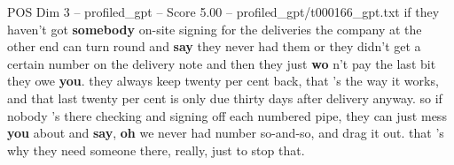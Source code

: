 \begin{textsample}{POS Dim 3 – profiled\_gpt – Score 5.00 – profiled\_gpt/t000166\_gpt.txt}  \label{ex:f3_pos_025}
if they haven't got \textbf{somebody} on-site signing for the deliveries the company at the other end can turn round and \textbf{say} they never had them or they didn't get a certain number on the delivery note and then they just \textbf{wo} n't pay the last bit they owe \textbf{you}. they always keep twenty per cent back, that 's the way it works, and that last twenty per cent is only due thirty days after delivery anyway. so if nobody 's there checking and signing off each numbered pipe, they can just mess \textbf{you} about and \textbf{say}, \textbf{oh} we never had number so-and-so, and drag it out. that 's why they need someone there, really, just to stop that.

\end{textsample}
